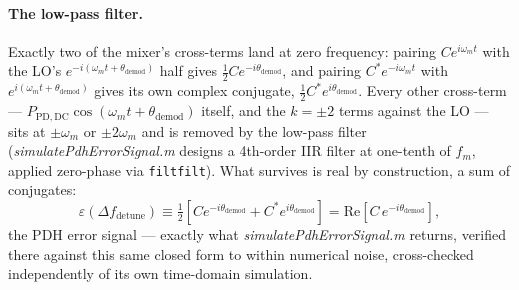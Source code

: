\documentclass[9pt]{article}
\begin{document}
\paragraph{The low-pass filter.} Exactly two of the mixer's cross-terms land at zero frequency: pairing
$Ce^{i\omega_m t}$ with the LO's $e^{-i(\omega_m t+\theta_{\mathrm{demod}})}$
half gives $\tfrac12 Ce^{-i\theta_{\mathrm{demod}}}$, and pairing
$C^*e^{-i\omega_m t}$ with $e^{i(\omega_m t+\theta_{\mathrm{demod}})}$
gives its own complex conjugate, $\tfrac12C^*e^{i\theta_{\mathrm{demod}}}$.
Every other cross-term --- $P_{\mathrm{PD,DC}}\cos(\omega_m t+\theta_{\mathrm{demod}})$
itself, and the $k=\pm2$ terms against the LO --- sits at $\pm\omega_m$ or
$\pm2\omega_m$ and is removed by the low-pass filter
(\textit{simulatePdhErrorSignal.m} designs a 4th-order IIR filter at
one-tenth of $f_m$, applied zero-phase via \texttt{filtfilt}). What survives
is real by construction, a sum of conjugates:
\begin{equation}
\varepsilon\!\left(\Delta f_{\mathrm{detune}}\right) \equiv \tfrac12\left[Ce^{-i\theta_{\mathrm{demod}}} + C^*e^{i\theta_{\mathrm{demod}}}\right] = \mathrm{Re}\!\left[C\,e^{-i\theta_{\mathrm{demod}}}\right],
\label{eq:pdh-error-signal}
\end{equation}
the PDH error signal --- exactly what \textit{simulatePdhErrorSignal.m}
returns, verified there against this same closed form to within numerical
noise, cross-checked independently of its own time-domain simulation.
\end{document}
